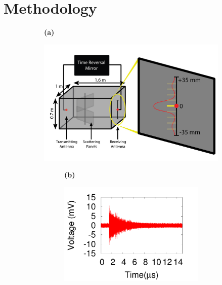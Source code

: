 \section{Methodology}
\label{sec:meth}


\begin{figure}[]
	\centering
	\begin{subfigure}[t]{0.03\columnwidth}
	\textbf{(a)}
	\end{subfigure}
	\begin{subfigure}[t]{0.9\columnwidth}
		\includegraphics[width=\columnwidth,valign=t]{figs/gigabox.jpg}
		\caption{\label{fig:gigabox}}
	\end{subfigure}
	\begin{subfigure}[]{0.9\columnwidth}
		\vspace{-1.5\baselineskip}
	\begin{subfigure}[t]{0.03\columnwidth}
	\textbf{(b)}
	\end{subfigure}
		\begin{subfigure}[t]{0.45\columnwidth}
				\centering
				\includegraphics[width=\columnwidth,valign=t]{figs/sona.pdf}

\end{subfigure}
\end{subfigure}
\end{figure}
